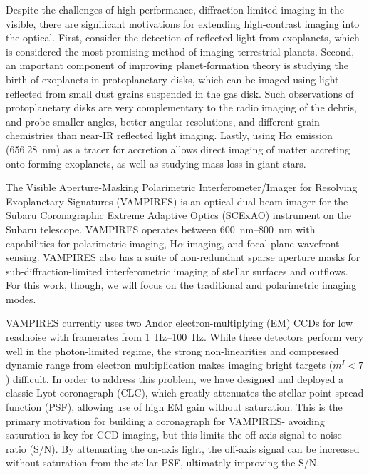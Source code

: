 \documentclass[]{spie}  %
\begin{document}
Despite the challenges of high-performance, diffraction limited imaging in the visible, there are significant motivations for extending high-contrast imaging into the optical. First, consider the detection of reflected-light from exoplanets, which is considered the most promising method of imaging terrestrial planets\cite{traub2010}. Second, an important component of improving planet-formation theory is studying the birth of exoplanets in protoplanetary disks, which can be imaged using light reflected from small dust grains suspended in the gas disk. Such observations of protoplanetary disks are very complementary to the radio imaging of the debris, and probe smaller angles, better angular resolutions, and different grain chemistries than near-IR reflected light imaging. Lastly, using H$\alpha$ emission (\qty{656.28}{\nano\meter}) as a tracer for accretion allows direct imaging of matter accreting onto forming exoplanets\cite{currie2022}, as well as studying mass-loss in giant stars\cite{norris2020}.

The Visible Aperture-Masking Polarimetric Interferometer/Imager for Resolving Exoplanetary Signatures (VAMPIRES)\cite{norris2015} is an optical dual-beam imager for the Subaru Coronagraphic Extreme Adaptive Optics (SCExAO) instrument on the Subaru telescope. VAMPIRES operates between \qtyrange{600}{800}{\nano\meter} with capabilities for polarimetric imaging\cite{norris2020}, H$\alpha$ imaging\cite{uyama2020}, and focal plane wavefront sensing\cite{vievard2020}. VAMPIRES also has a suite of non-redundant sparse aperture masks for sub-diffraction-limited interferometric imaging of stellar surfaces and outflows. For this work, though, we will focus on the traditional and polarimetric imaging modes.

VAMPIRES currently uses two Andor electron-multiplying (EM) CCDs for low readnoise with framerates from \qtyrange{1}{100}{\hertz}. While these detectors perform very well in the photon-limited regime, the strong non-linearities and compressed dynamic range from electron multiplication makes imaging bright targets ($m^I < 7$) difficult. In order to address this problem, we have designed and deployed a classic Lyot coronagraph (CLC), which greatly attenuates the stellar point spread function (PSF), allowing use of high EM gain without saturation. This is the primary motivation for building a coronagraph for VAMPIRES- avoiding saturation is key for CCD imaging, but this limits the off-axis signal to noise ratio (S/N). By attenuating the on-axis light, the off-axis signal can be increased without saturation from the stellar PSF, ultimately improving the S/N.
\end{document}
